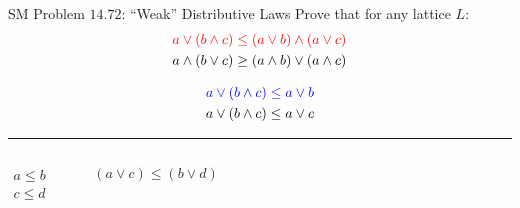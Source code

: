 \begin{frame}{}
  \begin{exampleblock}{SM Problem $14.72$: ``Weak'' Distributive Laws}
    Prove that for any lattice $L$:
    \begin{align*}
      \textcolor{red}{a \lor (b \land c) \le (a \lor b) \land (a \lor c)} \\
      a \land (b \lor c) \ge (a \land b) \lor (a \land c)
    \end{align*}
  \end{exampleblock}

  \pause
  \begin{align*}
    \textcolor{blue}{a \lor (b \land c) \le a \lor b} \\
    a \lor (b \land c) \le a \lor c
  \end{align*}

  \hrule
  \pause
  \begin{columns}
      \begin{align*}
	a \le b \\
	c \le d \\
      \end{align*}
      \vspace{-1.2cm}
      \hrule
      \vspace{-0.3cm}
      \[
	(a \lor c) \le (b \lor d)
      \]
  \end{columns}
\end{frame}

% 

